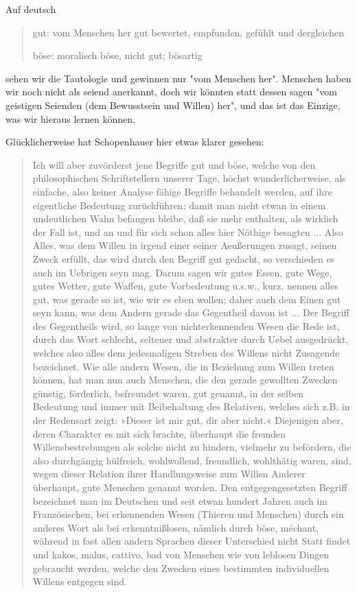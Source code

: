 \documentclass[12pt]{book}
\begin{document}
Auf deutsch
\begin{quote}\begin{tcolorbox}
gut: vom Menschen her gut bewertet, empfunden, gefühlt und dergleichen

böse: moralisch böse, nicht gut; bösartig
\end{tcolorbox}\end{quote}
sehen wir die Tautologie und gewinnen nur "vom Menschen her". Menschen haben wir noch nicht als seiend anerkannt, doch wir könnten statt dessen sagen "vom geistigen Seienden  (dem Bewusstsein und Willen) her", und das ist das Einzige, was wir hieraus lernen können. 

Glücklicherweise hat Schopenhauer hier etwas klarer gesehen:
\begin{quote}\begin{tcolorbox}
Ich will aber zuvörderst jene Begriffe gut und böse, welche von den philosophischen Schriftstellern unserer Tage, höchst wunderlicherweise, als einfache, also keiner Analyse fähige Begriffe behandelt werden, auf ihre eigentliche Bedeutung zurückführen; damit man nicht etwan in einem undeutlichen Wahn befangen bleibe, daß sie mehr enthalten, als wirklich der Fall ist, und an und für sich schon alles hier Nöthige besagten ...
Also Alles, was dem Willen in irgend einer seiner Aeußerungen zusagt, seinen Zweck erfüllt, das wird durch den Begriff gut gedacht, so verschieden es auch im Uebrigen seyn mag. Darum sagen wir gutes Essen, gute Wege, gutes Wetter, gute Waffen, gute Vorbedeutung u.s.w., kurz, nennen alles gut, was gerade so ist, wie wir es eben wollen; daher auch dem Einen gut seyn kann, was dem Andern gerade das Gegentheil davon ist ...
Der Begriff des Gegentheils wird, so lange von nichterkennenden Wesen die Rede ist, durch das Wort schlecht, seltener und abstrakter durch Uebel ausgedrückt, welches also alles dem jedesmaligen Streben des Willens nicht Zusagende bezeichnet. Wie alle andern Wesen, die in Beziehung zum Willen treten können, hat man nun auch Menschen, die den gerade gewollten Zwecken günstig, förderlich, befreundet waren, gut genannt, in der selben Bedeutung und immer mit Beibehaltung des Relativen, welches sich z.B. in der Redensart zeigt: »Dieser ist mir gut, dir aber nicht.« Diejenigen aber, deren Charakter es mit sich brachte, überhaupt die fremden Willensbestrebungen als solche nicht zu hindern, vielmehr zu befördern, die also durchgängig hülfreich, wohlwollend, freundlich, wohlthätig waren, sind, wegen dieser Relation ihrer Handlungsweise zum Willen Anderer überhaupt, gute Menschen genannt worden. Den entgegengesetzten Begriff bezeichnet man im Deutschen und seit etwan hundert Jahren auch im Französischen, bei erkennenden Wesen (Thieren und Menschen) durch ein anderes Wort als bei erkenntnißlosen, nämlich durch böse, méchant, während in fast allen andern Sprachen dieser Unterschied nicht Statt findet und kakos, malus, cattivo, bad von Menschen wie von leblosen Dingen gebraucht werden, welche den Zwecken eines bestimmten individuellen Willens entgegen sind.
\end{tcolorbox}\end{quote}
\end{document}
